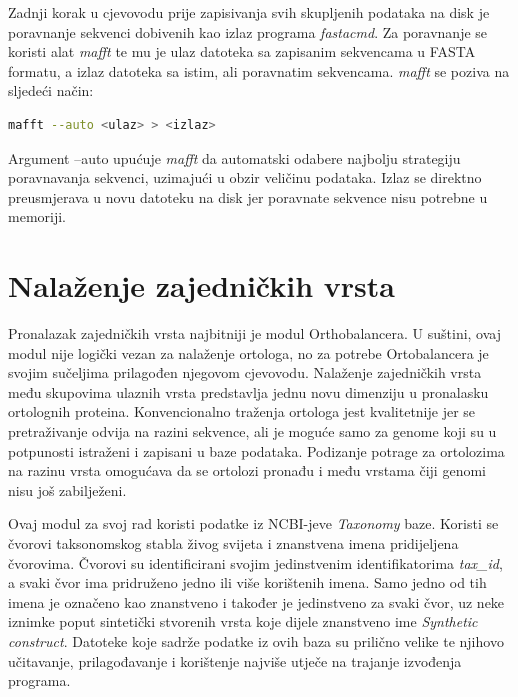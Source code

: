 Zadnji korak u cjevovodu prije zapisivanja svih skupljenih podataka na disk je
poravnanje sekvenci dobivenih kao izlaz programa \emph{fastacmd}. Za poravnanje
se koristi alat \emph{mafft}\cite{mafft} te mu je ulaz datoteka sa zapisanim sekvencama u FASTA
formatu, a izlaz datoteka sa istim, ali poravnatim sekvencama. \emph{mafft} se
poziva na sljedeći način:
\begin{lstlisting}[language=bash]
mafft --auto <ulaz> > <izlaz>
\end{lstlisting} 
Argument --auto upućuje \emph{mafft} da automatski odabere najbolju strategiju
poravnavanja sekvenci, uzimajući u obzir veličinu podataka. Izlaz se direktno
preusmjerava u novu datoteku na disk jer poravnate sekvence nisu potrebne u
memoriji.




\section{Nalaženje zajedničkih vrsta}
\label{sec:tax}

Pronalazak zajedničkih vrsta najbitniji je modul Orthobalancera. U suštini, ovaj
modul nije logički vezan za nalaženje ortologa, no za potrebe Ortobalancera je
svojim sučeljima prilagođen njegovom cjevovodu. Nalaženje zajedničkih vrsta među
skupovima ulaznih vrsta predstavlja jednu novu dimenziju u pronalasku ortolognih
proteina. Konvencionalno traženja ortologa\cite{Tatusov, Baratham} jest
kvalitetnije jer se pretraživanje odvija na razini sekvence, ali je moguće samo
za genome koji su u potpunosti istraženi i zapisani u baze
podataka.\cite{Flicek} Podizanje potrage za ortolozima na razinu vrsta omogućava
da se ortolozi pronađu i među vrstama čiji genomi nisu još zabilježeni.

Ovaj modul za svoj rad koristi podatke iz NCBI-jeve \emph{Taxonomy} baze.
Koristi se čvorovi taksonomskog stabla živog svijeta i znanstvena imena
pridijeljena čvorovima. Čvorovi su identificirani svojim jedinstvenim
identifikatorima \emph{tax\_id}, a svaki čvor ima pridruženo jedno ili više
korištenih imena. Samo jedno od tih imena je označeno kao znanstveno i također
je jedinstveno za svaki čvor, uz neke iznimke poput sintetički stvorenih vrsta
koje dijele znanstveno ime \emph{Synthetic construct}. Datoteke koje sadrže
podatke iz ovih baza su prilično velike te njihovo učitavanje, prilagođavanje i
korištenje najviše utječe na trajanje izvođenja programa.

